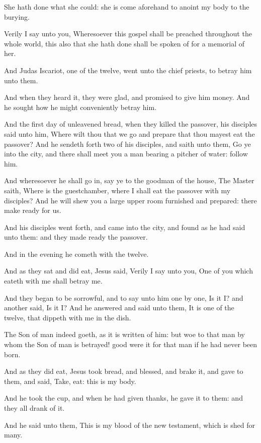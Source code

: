 \verse She hath done what she could: she is come aforehand to anoint my body to the burying.

\verse Verily I say unto you, Wheresoever this gospel shall be preached throughout the whole world, this also that she hath done shall be spoken of for a memorial of her.

\verse And Judas Iscariot, one of the twelve, went unto the chief priests, to betray him unto them.

\verse And when they heard it, they were glad, and promised to give him money. And he sought how he might conveniently betray him.

\verse And the first day of unleavened bread, when they killed the passover, his disciples said unto him, Where wilt thou that we go and prepare that thou mayest eat the passover?  \verse And he sendeth forth two of his disciples, and saith unto them, Go ye into the city, and there shall meet you a man bearing a pitcher of water: follow him.

\verse And wheresoever he shall go in, say ye to the goodman of the house, The Master saith, Where is the guestchamber, where I shall eat the passover with my disciples?  \verse And he will shew you a large upper room furnished and prepared: there make ready for us.

\verse And his disciples went forth, and came into the city, and found as he had said unto them: and they made ready the passover.

\verse And in the evening he cometh with the twelve.

\verse And as they sat and did eat, Jesus said, Verily I say unto you, One of you which eateth with me shall betray me.

\verse And they began to be sorrowful, and to say unto him one by one, Is it I? and another said, Is it I?  \verse And he answered and said unto them, It is one of the twelve, that dippeth with me in the dish.

\verse The Son of man indeed goeth, as it is written of him: but woe to that man by whom the Son of man is betrayed! good were it for that man if he had never been born.

\verse And as they did eat, Jesus took bread, and blessed, and brake it, and gave to them, and said, Take, eat: this is my body.

\verse And he took the cup, and when he had given thanks, he gave it to them: and they all drank of it.

\verse And he said unto them, This is my blood of the new testament, which is shed for many.

